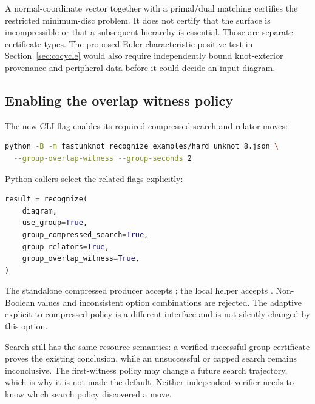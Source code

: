 A normal-coordinate vector together with a primal/dual matching certifies
the restricted minimum-disc problem. It does not certify that the surface
is incompressible or that a subsequent hierarchy is essential. Those are
separate certificate types. The proposed Euler-characteristic positive test
in Section~\ref{sec:cocycle} would also require independently bound
knot-exterior provenance and peripheral data before it could decide an
input diagram.

\subsection{Enabling the overlap witness policy}

The new CLI flag enables its required compressed search and relator moves:
\par\noindent\begin{minipage}{\linewidth}
\begin{lstlisting}[language=bash]
python -B -m fastunknot recognize examples/hard_unknot_8.json \
  --group-overlap-witness --group-seconds 2
\end{lstlisting}
\end{minipage}\par

Python callers select the related flags explicitly:
\par\noindent\begin{minipage}{\linewidth}
\begin{lstlisting}[language=Python]
result = recognize(
    diagram,
    use_group=True,
    group_compressed_search=True,
    group_relators=True,
    group_overlap_witness=True,
)
\end{lstlisting}
\end{minipage}\par

The standalone compressed producer accepts
; the local helper accepts
\code{witness\_first=True}. Non-Boolean values and inconsistent option
combinations are rejected. The adaptive explicit-to-compressed policy is a
different interface and is not silently changed by this option.

Search still has the same resource semantics: a verified successful group
certificate proves the existing conclusion, while an unsuccessful or capped
search remains inconclusive. The first-witness policy may change a future
search trajectory, which is why it is not made the default. Neither
independent verifier needs to know which search policy discovered a move.

